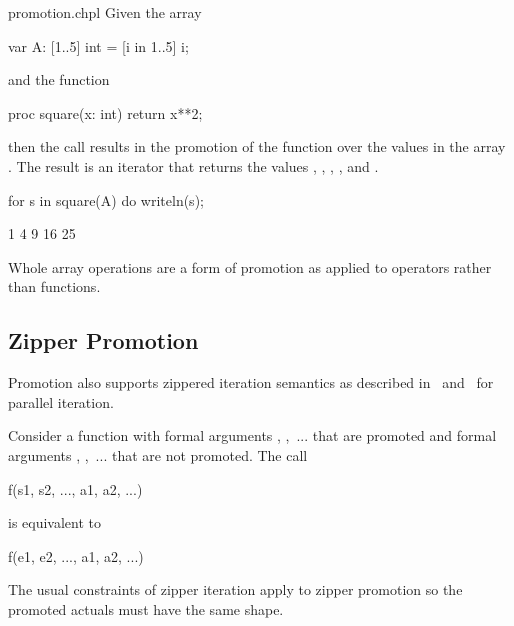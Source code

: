 \begin{chapelexample}{promotion.chpl}
Given the array
\begin{chapel}
var A: [1..5] int = [i in 1..5] i;
\end{chapel}
and the function
\begin{chapel}
proc square(x: int) return x**2;
\end{chapel}
then the call  results in the promotion of
the  function over the values in the array .  The
result is an iterator that returns the
values , , , , and .
\begin{chapelnoprint}
for s in square(A) do writeln(s);
\end{chapelnoprint}
\begin{chapeloutput}
1
4
9
16
25
\end{chapeloutput}
\end{chapelexample}


Whole array operations are a form of promotion as applied to operators
rather than functions.


\subsection{Zipper Promotion}
\label{Zipper_Promotion}

Promotion also supports zippered iteration semantics as described
in~ and~ for parallel
iteration.

Consider a function  with formal
arguments , ,~... that are promoted and formal
arguments , ,~... that are not promoted.  The call
\begin{chapel}
f(s1, s2, ..., a1, a2, ...)
\end{chapel}
is equivalent to
\begin{chapel}
[(e1, e2, ...) in zip(s1, s2, ...)] f(e1, e2, ..., a1, a2, ...)
\end{chapel}
The usual constraints of zipper iteration apply to zipper promotion so
the promoted actuals must have the same shape.

